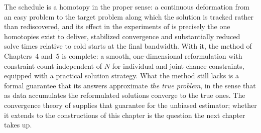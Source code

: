 The schedule is a homotopy in the proper sense: a continuous deformation
from an easy problem to the target problem along which the solution is
tracked rather than rediscovered, and its effect in the experiments of
\citet{keil2021warm} is precisely the one homotopies exist to deliver,
stabilized convergence and substantially reduced solve times relative to
cold starts at the final bandwidth. With it, the method of Chapters~4
and~5 is complete: a smooth, one-dimensional reformulation with constraint count
independent of $N$ for individual and joint chance constraints, equipped with
a practical solution strategy. What the method still lacks is a formal
guarantee that its answers approximate \emph{the true problem}, in the
sense that as data accumulates the reformulated solutions converge to
the true ones. The convergence theory of \citet{schuster2025} supplies
that guarantee for the unbiased estimator; whether it extends to the
constructions of this chapter is the question the next chapter takes up.
